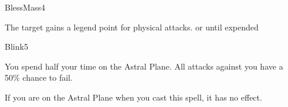 \begin{spellsection}{Bless}{Mass}{4}
\begin{spellheader}
\end{spellheader}
\begin{spellcontent}
    \begin{spelltargetinginfo}
    \end{spelltargetinginfo}
    \begin{spelleffects}
        \spelleffect The target gains a legend point for physical attacks.
        \spelldur \durshort or until expended
    \end{spelleffects}
\end{spellcontent}
\begin{spellfooter}
\end{spellfooter}
\end{spellsection}

\begin{spellsection}{Blink}{5}
\begin{spellheader}
\end{spellheader}
\begin{spellcontent}
    \begin{spelltargetinginfo}
    \end{spelltargetinginfo}
    \begin{spelleffects}
        \spelleffect You spend half your time on the Astral Plane. All attacks against you have a 50\% chance to fail.
        \spelldur \durshort \dismissable
    \end{spelleffects}
\end{spellcontent}
\begin{spellfooter}
    \spellnotes If you are on the Astral Plane when you cast this spell, it has no effect.
\end{spellfooter}
\end{spellsection}

